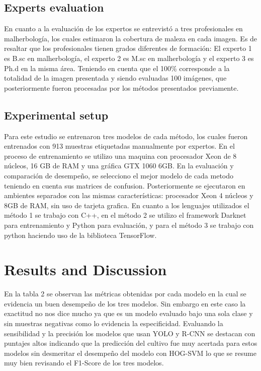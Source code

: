 \documentclass[journal,article,submit,moreauthors,pdftex]{Definitions/mdpi}
\begin{document}

\subsection{Experts evaluation}

En cuanto a la evaluación de los expertos se entrevistó a tres profesionales en malherbología, los cuales estimaron la cobertura de maleza en cada imagen. Es de resaltar que los profesionales tienen grados diferentes de formación: El experto 1 es B.sc en malherbología, el experto 2 es  M.sc en malherbología y el experto 3 es Ph.d en la misma área. Teniendo en cuenta que el 100\% corresponde a la totalidad de la imagen presentada y siendo evaluadas 100 imágenes, que posteriormente fueron procesadas por los métodos presentados previamente.

\subsection{Experimental setup}

Para este estudio se entrenaron tres modelos de cada método, los cuales fueron entrenados con 913 muestras etiquetadas manualmente por expertos. En el proceso de entrenamiento se utilizo una maquina con procesador Xeon de 8 núcleos, 16 GB de RAM y una gráfica GTX 1060 6GB. En la evaluación y comparación de desempeño, se selecciono el mejor modelo de cada metodo teniendo en cuenta sus matrices de confusion. Posteriormente se ejecutaron en ambientes separados con las mismas características: procesador Xeon 4 núcleos y 8GB de RAM, sin uso de tarjeta grafica. En cuanto a los lenguajes utilizados el método 1 se trabajo con C++, en el método 2 se utilizo el framework Darknet para entrenamiento y Python para evaluación, y para el método 3 se trabajo con python haciendo uso de la biblioteca TensorFlow.

\section{Results and Discussion}

En la tabla 2 se observan las métricas obtenidas por cada modelo en la cual se evidencia un buen desempeño de los tres modelos. Sin embargo  en este caso la exactitud no nos dice mucho ya que es un modelo evaluado bajo una sola clase y sin muestras negativas como lo evidencia la especificidad. Evaluando la sensibilidad y la precisión los modelos que usan YOLO y R-CNN se destacan con puntajes altos indicando que la predicción del cultivo fue muy acertada para estos modelos sin desmeritar el desempeño del modelo con HOG-SVM lo que se resume muy bien revisando el F1-Score de los tres modelos.
\end{document}
